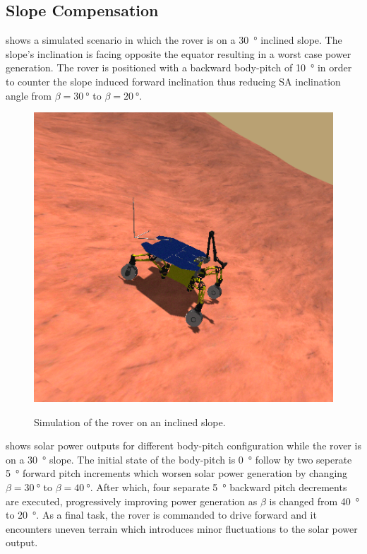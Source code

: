 \clearpage
\subsection{Slope Compensation}

 shows a simulated scenario in which the rover is on a \SI{30}{\degree} inclined slope. The slope's inclination is facing opposite the equator resulting in a worst case power generation. The rover is positioned with a backward body-pitch of \SI{10}{\degree} in order to counter the slope induced forward inclination thus reducing \ac{SA} inclination angle from $\beta=\SI{30}{\degree}$ to $\beta=\SI{20}{\degree}$.

\begin{figure}[h]
  \captionsetup[subfigure]{justification=centering}
  \centering
  \hypersetup{linkcolor=captionTextColor}
  \includegraphics[width=0.4\linewidth]{sections/design/simulation/images/counter-slope.png}\\
  \caption[Simulation of the rover on an inclined slope.]
          {Simulation of the rover on an inclined slope.}
  \label{fig:rover-counter-slope}
\end{figure}

 shows solar power outputs for different body-pitch configuration while the rover is on a \SI{30}{\degree} slope. The initial state of the body-pitch is \SI{0}{\degree} follow by two seperate \SI{5}{\degree} forward pitch increments which worsen solar power generation by changing $\beta=\SI{30}{\degree}$ to $\beta=\SI{40}{\degree}$. After which, four separate \SI{5}{\degree} backward pitch decrements are executed, progressively improving power generation as $\beta$ is changed from \SI{40}{\degree} to \SI{20}{\degree}. As a final task, the rover is commanded to drive forward and it encounters uneven terrain which introduces minor fluctuations to the solar power output.

\vspace{0.5cm}

